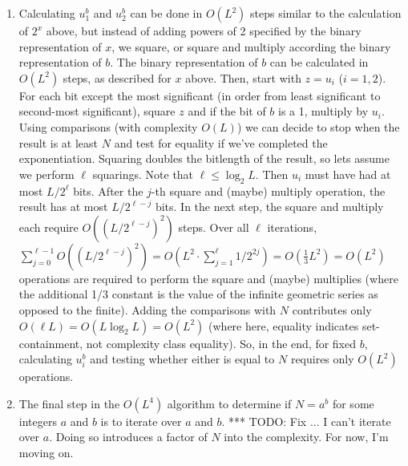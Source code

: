 \begin{enumerate}[label=(\arabic*)]
\item Calculating $u_1^b$ and $u_2^b$ can be done in $O(L^2)$ steps similar to the calculation of $2^x$ above, but instead of adding powers of 2 specified by the binary representation of $x$, we square, or square and multiply according the binary representation of $b$.  The binary representation of $b$ can be calculated in $O(L^2)$ steps, as described for $x$ above.  Then, start with $z=u_i$ ($i=1,2$).  For each bit except the most significant (in order from least significant to second-most significant), square $z$ and if the bit of $b$ is a 1, multiply by $u_i$.  Using comparisons (with complexity $O(L)$) we can decide to stop when the result is at least $N$ and test for equality if we've completed the exponentiation.   Squaring doubles the bitlength of the result, so lets assume we perform $\ell$ squarings.  Note that $\ell \leq \log_2 L$.  Then $u_i$ must have had at most $L/2^\ell$ bits.  After the $j$-th square and (maybe) multiply operation, the result has at most $L/2^{\ell-j}$ bits.  In the next step, the square and multiply each require $O((L/2^{\ell-j})^2)$ steps.  Over all $\ell$ iterations, $\sum_{j=0}^{\ell-1} O((L/2^{\ell-j})^2)= O(L^2 \cdot \sum_{j=1}^\ell 1/2^{2j})= O(\frac{1}{3} L^2) = O(L^2)$ operations are required to perform the square and (maybe) multiplies (where the additional 1/3 constant is the value of the infinite geometric series as opposed to the finite).  Adding the comparisons with $N$ contributes only $O(\ell L)= O(L\log_2 L)=O(L^2)$ (where here, equality indicates set-containment, not complexity class equality). So, in the end, for fixed $b$, calculating $u_i^b$ and testing whether either is equal to $N$ requires only $O(L^2)$ operations.
\item The final step in the $O(L^4)$ algorithm to determine if $N=a^b$ for some integers $a$ and $b$ is to iterate over $a$ and $b$.  *** TODO: Fix ... I can't iterate over $a$.  Doing so introduces a factor of $N$ into the complexity.  For now, I'm moving on.
\end{enumerate}

\newpage

